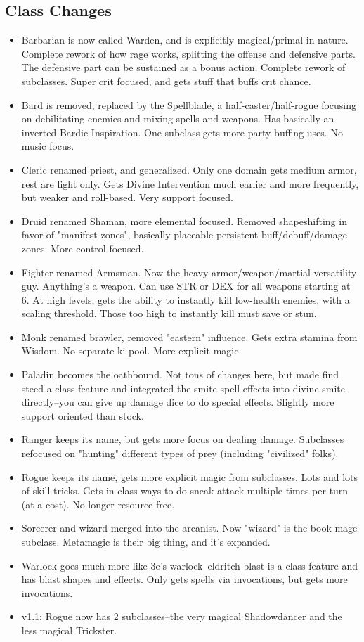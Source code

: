 \subsection*{Class Changes}
\begin{itemize}
    \item Barbarian is now called Warden, and is explicitly magical/primal in nature. Complete rework of how rage works, splitting the offense and defensive parts. The defensive part can be sustained as a bonus action. Complete rework of subclasses. Super crit focused, and gets stuff that buffs crit chance.
    \item Bard is removed, replaced by the Spellblade, a half-caster/half-rogue focusing on debilitating enemies and mixing spells and weapons. Has basically an inverted Bardic Inspiration. One subclass gets more party-buffing uses. No music focus.
    \item Cleric renamed priest, and generalized. Only one domain gets medium armor, rest are light only. Gets Divine Intervention much earlier and more frequently, but weaker and roll-based. Very support focused.
    \item Druid renamed Shaman, more elemental focused. Removed shapeshifting in favor of "manifest zones", basically placeable persistent buff/debuff/damage zones. More control focused.
    \item Fighter renamed Armsman. Now the heavy armor/weapon/martial versatility guy. Anything's a weapon. Can use STR or DEX for all weapons starting at 6. At high levels, gets the ability to instantly kill low-health enemies, with a scaling threshold. Those too high to instantly kill must save or stun.
    \item Monk renamed brawler, removed "eastern" influence. Gets extra stamina from Wisdom. No separate ki pool. More explicit magic.
    \item Paladin becomes the oathbound. Not tons of changes here, but made find steed a class feature and integrated the smite spell effects into divine smite directly--you can give up damage dice to do special effects. Slightly more support oriented than stock.
    \item Ranger keeps its name, but gets more focus on dealing damage. Subclasses refocused on "hunting" different types of prey (including "civilized" folks).
    \item Rogue keeps its name, gets more explicit magic from subclasses. Lots and lots of skill tricks. Gets in-class ways to do sneak attack multiple times per turn (at a cost). No longer resource free.
    \item Sorcerer and wizard merged into the arcanist. Now "wizard" is the book mage subclass. Metamagic is their big thing, and it's expanded.
    \item Warlock goes much more like 3e's warlock--eldritch blast is a class feature and has blast shapes and effects. Only gets spells via invocations, but gets more invocations.
    \item v1.1: Rogue now has 2 subclasses--the very magical Shadowdancer and the less magical Trickster.
\end{itemize}
